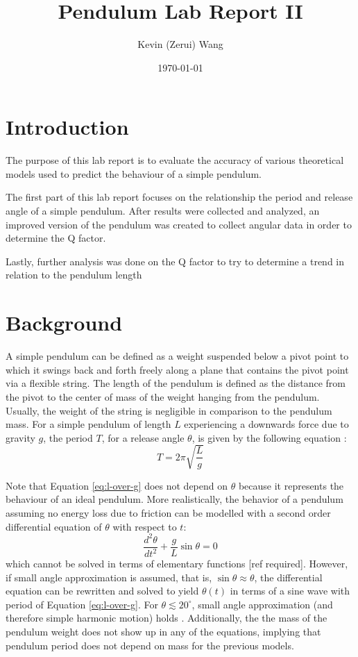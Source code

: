 \documentclass[12pt]{article}
\title{Pendulum Lab Report II}
\author{Kevin (Zerui) Wang}
\date{\today}
\begin{document}

\maketitle
\newpage


\section{Introduction}
The purpose of this lab report is to evaluate the accuracy of various theoretical models used to predict the behaviour of a simple pendulum.

The first part of this lab report focuses on the relationship the period and release angle of a simple pendulum. After results were collected and analyzed, an improved version of the pendulum was created to collect angular data in order to determine the Q factor.

Lastly, further analysis was done on the Q factor to try to determine a trend in relation to the pendulum length

\section{Background} \label{Background}
A simple pendulum can be defined as a weight suspended below a pivot point to which it swings back and forth freely along a plane that contains the pivot point via a flexible string. The length of the pendulum is defined as the distance from the pivot to the center of mass of the weight hanging from the pendulum. Usually, the weight of the string is negligible in comparison to the pendulum mass. For a simple pendulum of length $L$ experiencing a downwards force due to gravity $g$, the period $T$, for a release angle $\theta$, is given by the following equation \cite{the-simple-pendulum}:
\begin{equation} \label{eq:l-over-g}
    T = 2\pi \sqrt{\frac{L}{g}}
\end{equation}

Note that Equation \ref{eq:l-over-g} does not depend on $\theta$ because it represents the behaviour of an ideal pendulum. More realistically, the behavior of a pendulum assuming no energy loss due to friction can be modelled with a second order differential equation of $\theta$ with respect to $t$:
\begin{equation} \label{eq:diffeq-pendulum}
    \frac{d^2\theta}{dt^2} + \frac{g}{L}\sin{\theta} = 0
\end{equation}
which cannot be solved in terms of elementary functions [ref required]. However, if small angle approximation is assumed, that is, $\sin\theta \approx \theta$, the differential equation can be rewritten and solved to yield $\theta(t)$ in terms of a sine wave with period of Equation \ref{eq:l-over-g}. For $\theta \lesssim 20^{\circ}$, small angle approximation (and therefore simple harmonic motion) holds \cite{the-simple-pendulum}. Additionally, the the mass of the pendulum weight does not show up in any of the equations, implying that pendulum period does not depend on mass for the previous models.
\end{document}
